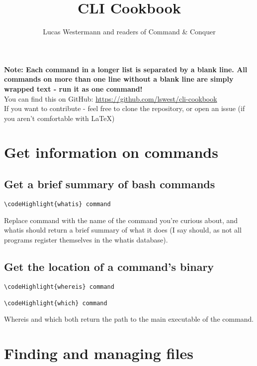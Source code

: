 \documentclass[12pt,a4paper]{article}
\begin{document}
\title{CLI Cookbook}
\author{Lucas Westermann and readers of Command \& Conquer}
\maketitle
\textbf{Note: Each command in a longer list is separated by a blank line.  All commands on more than one line without a blank line are simply wrapped text - run it as one command! } \\
You can find this on GitHub: \url{https://github.com/lswest/cli-cookbook}\\
If you want to contribute - feel free to clone the repository, or open an issue (if you aren't comfortable with LaTeX)
\pagebreak
\tableofcontents
\pagebreak

\newcommand\codeHighlight[1]{\textcolor[rgb]{1,0,0}{\textbf{#1}}}

\section{Get information on commands}
\label{Get information on commands}

\subsection{Get a brief summary of bash commands}
\begin{Verbatim}[commandchars=\\\{\}]
\codeHighlight{whatis} command
\end{Verbatim}
Replace command with the name of the command you're curious about, and whatis should return a brief summary of what it does (I say should, as not all programs register themselves in the whatis database).

\subsection{Get the location of a command's binary}
\begin{Verbatim}[commandchars=\\\{\}]
\codeHighlight{whereis} command

\codeHighlight{which} command
\end{Verbatim}
Whereis and which both return the path to the main executable of the command.

\section{Finding and managing files}
\label{Finding and managing files}
\end{document}
